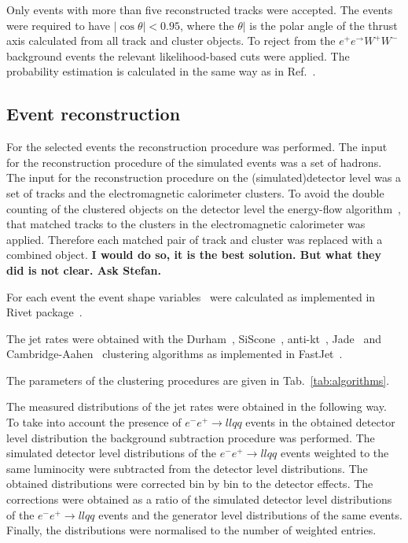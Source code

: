 Only events with more than five reconstructed tracks were accepted.
The events were required to have $|\cos\theta|<0.95$, where the  
$\theta|$ is the polar angle of the thrust axis calculated from all track
and cluster objects.
To reject from the $e^+e^\rightarrow W^+W^-$ background events the relevant likelihood-based cuts were applied.
The probability estimation is  calculated in the same way as in Ref.~\cite{Abbiendi:2000eg}.

\subsection{Event reconstruction}
\label{sec:reconstruction}
For the selected events the reconstruction procedure was performed.
The input for the reconstruction procedure of  the simulated events
was a set of hadrons.
The input for the reconstruction procedure on the (simulated)detector level
 was a set of tracks and the electromagnetic calorimeter clusters.
To avoid the double counting of the clustered objects on the detector level the energy-flow 
algorithm~\cite{Ackerstaff:1997nga,Abbiendi:1999sy}, that matched tracks to the 
 clusters in the electromagnetic calorimeter was applied. Therefore each 
 matched pair of track and cluster was replaced with a combined object.
 {\bf I would do so, it is the best solution. But what they did is not clear. Ask Stefan.}

For each event the event shape variables~\cite{OPAL:2011aa} 
were calculated  as  implemented in Rivet package~\cite{Buckley:2010ar}.

The jet rates were obtained with the Durham~\cite{Catani:1991hj}, SiScone~\cite{Cacciari:2005hq}, anti-kt~\cite{Cacciari:2008gp}, Jade~\cite{Bartel:1986ua}
  and Cambridge-Aahen~\cite{Dokshitzer:1997in}
clustering algorithms as implemented in FastJet~\cite{Cacciari:2011ma}.

The parameters of the clustering procedures are given in Tab.~\ref{tab:algorithms}.
\TABalgorithms

The measured distributions of the jet rates were obtained in the following way.
To take into account the presence of $e^-e^+ \rightarrow llqq$ events in the 
obtained detector level distribution the background subtraction procedure was performed.
The simulated detector level distributions of the $e^-e^+ \rightarrow llqq$ events 
weighted to the same luminocity were subtracted from the detector level distributions.
The obtained distributions were corrected bin by bin to the detector effects. 
The corrections were obtained as a ratio of 
the simulated detector level distributions of the $e^-e^+ \rightarrow llqq$ events 
and the generator level distributions of the same events.
Finally, the  distributions were normalised to the number of weighted entries.

